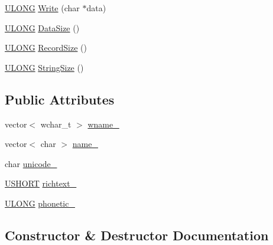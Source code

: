 \begin{DoxyCompactItemize}
\item 
\hyperlink{_basic_excel_8hpp_abe09d1bea023be6a07cbadde8e955435}{U\+L\+O\+N\+G} \hyperlink{struct_y_excel_1_1_large_string_a81b161a6af9982d9759f1bd2c3d532cc}{Write} (char $\ast$data)
\item 
\hyperlink{_basic_excel_8hpp_abe09d1bea023be6a07cbadde8e955435}{U\+L\+O\+N\+G} \hyperlink{struct_y_excel_1_1_large_string_a4ef217150110ed9d5edc6dc21ff53aa3}{Data\+Size} ()
\item 
\hyperlink{_basic_excel_8hpp_abe09d1bea023be6a07cbadde8e955435}{U\+L\+O\+N\+G} \hyperlink{struct_y_excel_1_1_large_string_a2b3b65375a3acfd892423c5e071b18d5}{Record\+Size} ()
\item 
\hyperlink{_basic_excel_8hpp_abe09d1bea023be6a07cbadde8e955435}{U\+L\+O\+N\+G} \hyperlink{struct_y_excel_1_1_large_string_a87829b1124c6865aec809b3f05675fe8}{String\+Size} ()
\end{DoxyCompactItemize}
\subsection*{Public Attributes}
\begin{DoxyCompactItemize}
\item 
vector$<$ wchar\+\_\+t $>$ \hyperlink{struct_y_excel_1_1_large_string_a1cdf115960a6d9f631357ff4c8e8cf29}{wname\+\_\+}
\item 
vector$<$ char $>$ \hyperlink{struct_y_excel_1_1_large_string_abb18c92740976002ef352df744b78b2f}{name\+\_\+}
\item 
char \hyperlink{struct_y_excel_1_1_large_string_a7244b82c6cd6fd9f936098351e9ce1bc}{unicode\+\_\+}
\item 
\hyperlink{_basic_excel_8hpp_a5850d5316caf7f4cedd742fdf8cd7c02}{U\+S\+H\+O\+R\+T} \hyperlink{struct_y_excel_1_1_large_string_ac48de9c0bf73ad13a236e8f40d5f8ae7}{richtext\+\_\+}
\item 
\hyperlink{_basic_excel_8hpp_abe09d1bea023be6a07cbadde8e955435}{U\+L\+O\+N\+G} \hyperlink{struct_y_excel_1_1_large_string_acba8956aa827ce592511d566d068bde1}{phonetic\+\_\+}
\end{DoxyCompactItemize}


\subsection{Constructor \& Destructor Documentation}
\hypertarget{struct_y_excel_1_1_large_string_a8020faa48b2977504d1a5f80637d6fea}{}
